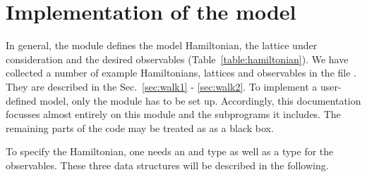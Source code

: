 
\section{Implementation of the model} \label{sec:imp}

In general, the module  defines the model Hamiltonian, the lattice under consideration and the desired observables (Table~\ref{table:hamiltonian}). 
We have collected a number of example Hamiltonians, lattices and observables in the file  .  They are described in the Sec.~\ref{sec:walk1} - \ref{sec:walk2}.
To implement a user-defined model, only the module  has to be set up. Accordingly, this documentation focusses almost entirely  on this module and the subprograms it includes. 
The remaining parts of the code may be treated as as a black box.  

To specify the Hamiltonian, one needs  an   and  type as well as a type for the observables. These three data structures will be described in the following. 

